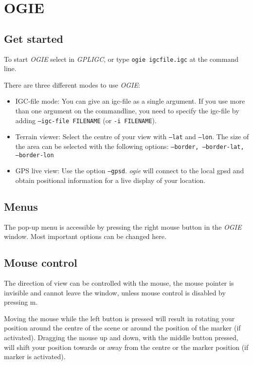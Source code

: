 
\section{OGIE}
\label{ogie}

\subsection{Get started}
To start \emph{OGIE} select  in \emph{GPLIGC},
or type \texttt{ogie igcfile.igc}
at the command line.%

There are three different modes to use \emph{OGIE}:

\begin{itemize}

\item IGC-file mode:
You can give an igc-file as a single argument.
If you use more than one argument on the commandline, you need to specify
the igc-file by adding  \texttt{--igc-file FILENAME} (or \texttt{-i FILENAME}).

\item Terrain viewer: Select the centre of your view with  \texttt{--lat} and \texttt{--lon}. The size of the area can be selected with the following options: \texttt{--border, --border-lat, --border-lon}

\item GPS live view: Use the option \texttt{--gpsd}. \emph{ogie} will connect to the local gpsd \cite{gpsd} and obtain positional information for a live display of your location.

\end{itemize}

\subsection{Menus}
The pop-up menu is accessible by pressing the right mouse button in the \emph{OGIE} window. Most important options can be changed here.


\subsection{Mouse control}
The direction of view can be controlled with the mouse, the mouse pointer is invisible and cannot leave the window, unless
mouse control is disabled by pressing m.

Moving the mouse while the left button is pressed will result in rotating your position around the centre of the scene or around
the position of the marker (if activated). Dragging the mouse up and down, with the middle button pressed, will shift your
position towards or away from the centre or the marker position (if marker is activated).


